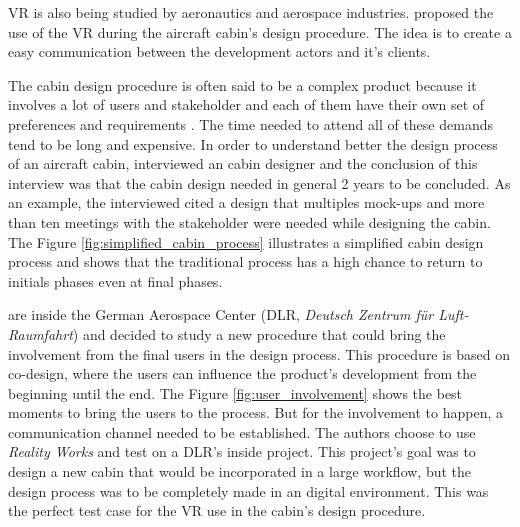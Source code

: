 
VR is also being studied by aeronautics and aerospace industries. \citeauthor{moerland2021application} proposed the use of the VR during the aircraft cabin's design procedure. The idea is to create a easy communication between the development actors and it's clients.

The cabin design procedure is often said to be a complex product because it involves a lot of users and stakeholder and each of them have their own set of preferences and requirements \citeauthor{moerland2021application}. The time needed to attend all of these demands tend to be long and expensive. In order to understand better the design process of an aircraft cabin, \citeauthor{moerland2021application} interviewed an cabin designer and the conclusion of this interview was that the cabin design needed in general 2 years to be concluded. As an example, the interviewed cited a design that multiples mock-ups and more than ten meetings with the stakeholder were needed while designing the cabin. The Figure \ref{fig:simplified_cabin_process} illustrates a simplified cabin design process and shows that the traditional process has a high chance to return to initials phases even at final phases.






\citeauthor{moerland2021application} are inside the German Aerospace Center (DLR, \textit{Deutsch Zentrum für Luft- Raumfahrt}) and decided to study a new procedure that could bring the involvement from the final users in the design process. This procedure is based on co-design, where the users can influence the product's development from the beginning until the end. The Figure \ref{fig:user_involvement} shows the best moments to bring the users to the process. But for the involvement to happen, a communication channel needed to be established. The authors choose to use \textit{Reality Works} and test on a DLR's inside project. This project's goal was to design a new cabin that would be incorporated in a large workflow, but the design process was to be completely made in an digital environment. This was the perfect test case for the VR use in the cabin's design procedure.

